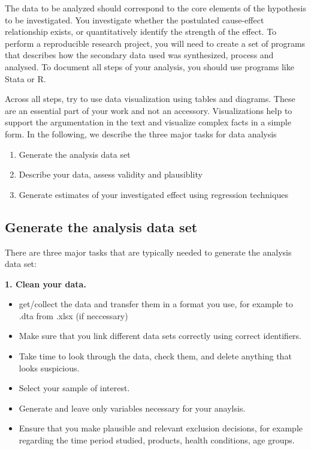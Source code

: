 \documentclass[
]{book}
\providecommand{\tightlist}{%
  \setlength{\itemsep}{0pt}\setlength{\parskip}{0pt}}
\begin{document}
The data to be analyzed should correspond to the core elements of the
hypothesis to be investigated. You investigate whether the postulated
cause-effect relationship exists, or quantitatively identify the
strength of the effect. To perform a reproducible research project, you
will need to create a set of programs that describes how the secondary
data used was synthesized, process and analysed. To document all steps
of your analysis, you should use programs like Stata or R.

Across all steps, try to use data visualization using tables and
diagrams. These are an essential part of your work and not an accessory.
Visualizations help to support the argumentation in the text and
visualize complex facts in a simple form. In the following, we describe
the three major tasks for data analysis

\begin{enumerate}
\def\labelenumi{\arabic{enumi}.}
\tightlist
\item
  Generate the analysis data set
\item
  Describe your data, assess validity and plausiblity
\item
  Generate estimates of your investigated effect using regression
  techniques
\end{enumerate}

\hypertarget{generate-the-analysis-data-set}{%
\subsection{Generate the analysis data
set}\label{generate-the-analysis-data-set}}

There are three major tasks that are typically needed to generate the
analysis data set:

\textbf{1. Clean your data.}

\begin{itemize}
\tightlist
\item
  get/collect the data and transfer them in a format you use, for
  example to .dta from .xlsx (if neccessary)
\item
  Make sure that you link different data sets correctly using correct
  identifiers.
\item
  Take time to look through the data, check them, and delete anything
  that looks suspicious.
\item
  Select your sample of interest.
\item
  Generate and leave only variables necessary for your anaylsis.
\item
  Ensure that you make plausible and relevant exclusion decisions, for
  example regarding the time period studied, products, health
  conditions, age groups.
\end{itemize}
\end{document}
